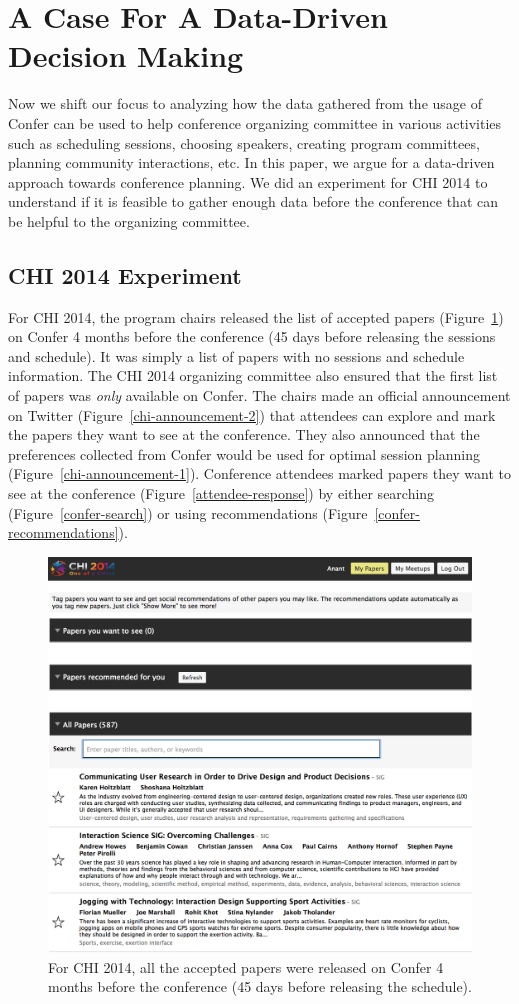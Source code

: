 \documentclass{sigchi}
\begin{document}
\section{A Case For A Data-Driven Decision Making}
Now we shift our focus to analyzing how the data gathered from the usage of Confer can be used to help conference organizing committee in various activities such as scheduling sessions, choosing speakers, creating program committees, planning community interactions, etc. In this paper, we argue for a data-driven approach towards conference planning. We did an experiment for CHI 2014 to understand if it is feasible to gather enough data before the conference that can be helpful to the organizing committee. 
\subsection{CHI 2014 Experiment}
For CHI 2014, the program chairs released the list of accepted papers (Figure~\ref{all-accepted-papers}) on Confer 4 months before the conference (45 days before releasing the sessions and schedule). It was simply a list of papers with no sessions and schedule information. The CHI 2014 organizing committee also ensured that the first list of papers was \emph{only} available on Confer. The chairs made an official announcement on Twitter (Figure~\ref{chi-announcement-2}) that attendees can explore and mark the papers they want to see at the conference. They also announced that the preferences collected from Confer would be used for optimal session planning (Figure~\ref{chi-announcement-1}). Conference attendees marked papers they want to see at the conference (Figure~\ref{attendee-response}) by either searching (Figure~\ref{confer-search}) or using recommendations (Figure~\ref{confer-recommendations}).

\begin{figure}[!h]
\centering
\includegraphics[width=0.95\columnwidth]{all-accepted-papers.png}
\caption{For CHI 2014, all the accepted papers were released on Confer 4 months before the conference (45 days before releasing the schedule).}
\label{all-accepted-papers}
\end{figure}
\end{document}
